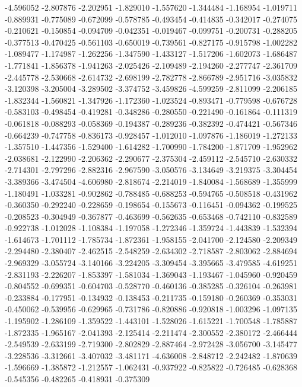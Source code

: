 -4.596052
-2.807876
-2.202951
-1.829010
-1.557620
-1.344484
-1.168954
-1.019711
-0.889931
-0.775089
-0.672099
-0.578785
-0.493454
-0.414835
-0.342017
-0.274075
-0.210621
-0.150854
-0.094709
-0.042351
-0.019467
-0.099751
-0.200731
-0.288205
-0.377513
-0.470425
-0.561103
-0.650019
-0.739561
-0.827175
-0.915798
-1.002282
-1.089477
-1.174987
-1.262256
-1.347590
-1.433127
-1.517206
-1.602073
-1.686487
-1.771841
-1.856378
-1.941263
-2.025426
-2.109489
-2.194260
-2.277747
-2.361709
-2.445778
-2.530668
-2.614732
-2.698199
-2.782778
-2.866789
-2.951716
-3.035832
-3.120398
-3.205004
-3.289502
-3.374752
-3.459826
-4.599259
-2.811099
-2.206185
-1.832344
-1.560821
-1.347926
-1.172360
-1.023524
-0.893471
-0.779598
-0.676728
-0.583103
-0.498454
-0.419281
-0.348286
-0.280550
-0.221490
-0.161864
-0.111319
-0.061818
-0.088293
-0.058369
-0.194387
-0.289236
-0.382392
-0.474421
-0.567346
-0.664239
-0.747758
-0.836173
-0.928457
-1.012010
-1.097876
-1.186019
-1.272133
-1.357510
-1.447356
-1.529400
-1.614282
-1.700990
-1.784200
-1.871709
-1.952962
-2.038681
-2.122990
-2.206362
-2.290677
-2.375304
-2.459112
-2.545710
-2.630332
-2.714301
-2.797296
-2.882316
-2.967590
-3.050576
-3.134649
-3.219375
-3.304454
-3.389366
-3.474504
-4.606980
-2.818674
-2.214019
-1.840084
-1.568689
-1.355999
-1.180491
-1.033281
-0.902862
-0.788485
-0.688253
-0.594765
-0.508518
-0.431962
-0.360350
-0.292240
-0.228659
-0.198654
-0.155673
-0.116451
-0.094362
-0.199525
-0.208523
-0.304949
-0.367877
-0.463699
-0.562635
-0.653468
-0.742110
-0.832589
-0.922738
-1.012028
-1.108384
-1.197058
-1.272346
-1.359724
-1.443839
-1.532394
-1.614673
-1.701112
-1.785734
-1.872361
-1.958155
-2.041700
-2.124580
-2.209349
-2.294480
-2.380407
-2.462515
-2.548259
-2.634302
-2.718587
-2.803062
-2.884694
-2.969329
-3.055724
-3.140166
-3.224205
-3.309454
-3.395665
-3.479585
-4.619251
-2.831193
-2.226207
-1.853397
-1.581034
-1.369043
-1.193467
-1.045960
-0.920459
-0.804552
-0.699351
-0.604703
-0.528770
-0.460136
-0.385285
-0.326104
-0.263981
-0.233884
-0.177951
-0.134932
-0.138453
-0.211735
-0.159180
-0.260369
-0.353031
-0.450062
-0.539956
-0.629965
-0.731786
-0.820886
-0.920818
-1.003296
-1.097135
-1.195902
-1.286109
-1.359522
-1.443101
-1.528026
-1.615221
-1.700548
-1.785887
-1.872335
-1.965167
-2.041393
-2.125414
-2.211474
-2.300552
-2.380172
-2.466444
-2.549539
-2.633199
-2.719300
-2.802829
-2.887464
-2.972428
-3.056700
-3.145477
-3.228536
-3.312661
-3.407032
-3.481171
-4.636008
-2.848712
-2.242482
-1.870639
-1.596669
-1.385872
-1.212557
-1.062431
-0.937922
-0.825822
-0.726485
-0.628368
-0.545356
-0.482265
-0.418931
-0.375309
